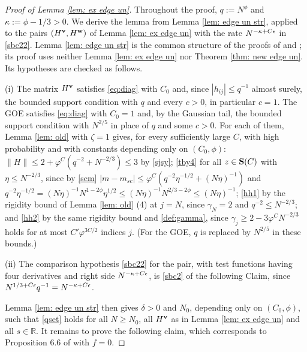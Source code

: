 \begin{proof}[Proof of Lemma \ref{lem: ex edge un}]
Throughout the proof, $q:=N^{\phi}$ and $\kappa:=\phi-1/3>0$. We derive the lemma from Lemma \ref{lem: edge un str}, applied to the pairs $(H^{\mathbf{v}},H^{\mathbf{w}})$ of Lemma \ref{lem: ex edge un} with the rate $N^{-\kappa+C\epsilon}$ in \eqref{sbc22}. Lemma \ref{lem: edge un str} is the common structure of the proofs of \cite[Theorem 2.4]{EYY} and \cite[Proposition 6.4]{EKYY2}; its proof uses neither Lemma \ref{lem: ex edge un} nor Theorem \ref{thm: new edge un}. Its hypotheses are checked as follows.

(i) The matrix $H^{\mathbf{v}}$ satisfies \eqref{eq:diag} with $C_0$ and, since $|h_{ij}|\le q^{-1}$ almost surely, the bounded support condition with $q$ and every $c>0$, in particular $c=1$. The GOE satisfies \eqref{eq:diag} with $C_0=1$ and, by the Gaussian tail, the bounded support condition with $N^{2/5}$ in place of $q$ and some $c>0$. For each of them, Lemma \ref{lem: old} with $\zeta=1$ gives, for every sufficiently large $C$, with high probability and with constants depending only on $(C_0,\phi)$: $\|H\|\le 2+\varphi^C(q^{-2}+N^{-2/3})\le 3$ by \eqref{sjsy}; \eqref{tby4} for all $z\in{\bf S}(C)$ with $\eta\le N^{-2/3}$, since by \eqref{scm} $|m-m_{sc}|\le\varphi^C(q^{-2}\eta^{-1/2}+(N\eta)^{-1})$ and $q^{-2}\eta^{-1/2}=(N\eta)^{-1}N^{1-2\phi}\eta^{1/2}\le(N\eta)^{-1}N^{2/3-2\phi}\le (N\eta)^{-1}$; \eqref{hh1} by the rigidity bound of Lemma \ref{lem: old} (4) at $j=N$, since $\gamma_N=2$ and $q^{-2}\le N^{-2/3}$; and \eqref{hh2} by the same rigidity bound and \eqref{def:gamma}, since $\gamma_j\ge 2-3\varphi^CN^{-2/3}$ holds for at most $C'\varphi^{3C/2}$ indices $j$. (For the GOE, $q$ is replaced by $N^{2/5}$ in these bounds.)

(ii) The comparison hypothesis \eqref{sbc22} for the pair, with test functions having four derivatives and right side $N^{-\kappa+C\epsilon}$, is \eqref{sbc2} of the following Claim, since $N^{1/3+C\epsilon}q^{-1}=N^{-\kappa+C\epsilon}$.

Lemma \ref{lem: edge un str} then gives $\delta>0$ and $N_0$, depending only on $(C_0,\phi)$, such that \eqref{qset} holds for all $N\ge N_0$, all $H^{\mathbf{v}}$ as in Lemma \ref{lem: ex edge un} and all $s\in\mathbb R$. It remains to prove the following claim, which corresponds to Proposition 6.6 of \cite{EKYY2} with $f=0$.


\end{proof}
